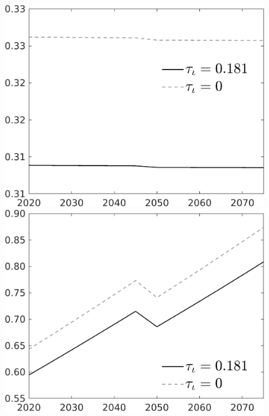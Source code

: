 \documentclass[12pt]{article}
\begin{document}
\begin{figure}[h!!]
\begin{minipage}[]{0.32\textwidth}
\end{minipage}	
\begin{minipage}[]{0.32\textwidth}
\includegraphics[width=1\textwidth]{../../codding_model/own_basedOnFried/optimalPol_010922_revision/figures/all_13Sept22/CompTauf_bytaul_Reg0_hl_spillover0_nsk0_xgr0_knspil0_sep0_LFlimit1_emsbase0_countec0_GovRev0_etaa0.79_lgd1.png}
\end{minipage}	
\begin{minipage}[]{0.32\textwidth}
\includegraphics[width=1\textwidth]{../../codding_model/own_basedOnFried/optimalPol_010922_revision/figures/all_13Sept22/CompTauf_bytaul_Reg0_C_spillover0_nsk0_xgr0_knspil0_sep0_LFlimit1_emsbase0_countec0_GovRev0_etaa0.79_lgd1.png}

\end{minipage}
\end{figure}
\end{document}

